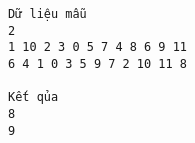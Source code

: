 \begin{verbatim}
Dữ liệu mẫu
2
1 10 2 3 0 5 7 4 8 6 9 11
6 4 1 0 3 5 9 7 2 10 11 8

Kết qủa
8
9
\end{verbatim}